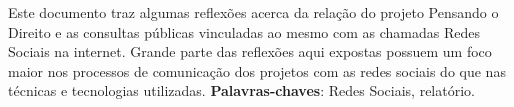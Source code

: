\setlength{\absparsep}{18pt} %
\begin{resumo}
Este documento traz algumas reflexões acerca da relação do projeto Pensando o Direito e as consultas públicas vinculadas ao mesmo com as chamadas Redes Sociais na internet.
%
Grande parte das reflexões aqui expostas possuem um foco maior nos processos de comunicação dos projetos com as redes sociais do que nas técnicas e tecnologias utilizadas.
 \noindent
 \textbf{Palavras-chaves}: Redes Sociais, relatório.
\end{resumo}
